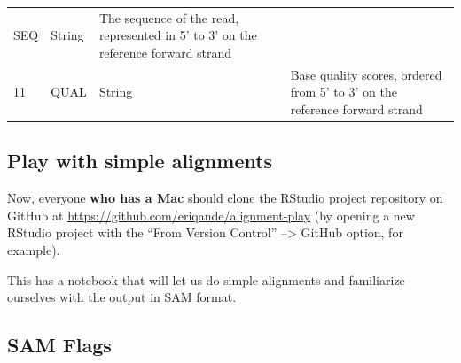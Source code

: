 \documentclass[]{krantz}
\begin{document}
\begin{longtable}[]{@{}llll@{}}
\begin{minipage}[t]{0.10\columnwidth}
SEQ\strut
\end{minipage} & \begin{minipage}[t]{0.15\columnwidth}\raggedright
String\strut
\end{minipage} & \begin{minipage}[t]{0.41\columnwidth}\raggedright
The sequence of the read,
represented in 5' to 3' on the
reference forward strand\strut
\end{minipage}\tabularnewline
\begin{minipage}[t]{0.11\columnwidth}\raggedright
11\strut
\end{minipage} & \begin{minipage}[t]{0.10\columnwidth}\raggedright
QUAL\strut
\end{minipage} & \begin{minipage}[t]{0.15\columnwidth}\raggedright
String\strut
\end{minipage} & \begin{minipage}[t]{0.41\columnwidth}\raggedright
Base quality scores, ordered
from 5' to 3' on the reference
forward strand\strut
\end{minipage}\tabularnewline
\bottomrule
\end{longtable}

\hypertarget{play-with-simple-alignments}{%
\subsection{Play with simple alignments}\label{play-with-simple-alignments}}

Now, everyone \textbf{who has a Mac} should clone the RStudio project repository on GitHub at \url{https://github.com/eriqande/alignment-play}
(by opening a new RStudio project with the ``From Version Control'' --\textgreater{} GitHub option, for example).

This has a notebook that will let us do simple alignments and familiarize
ourselves with the output in SAM format.

\hypertarget{sam-flags}{%
\subsection{SAM Flags}\label{sam-flags}}
\end{document}

